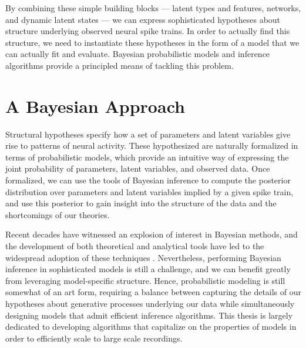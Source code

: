 By combining these simple building blocks --- latent types and features, 
networks, and dynamic latent states --- we can express sophisticated 
hypotheses about structure underlying observed neural spike trains. 
In order to actually find this structure, we need to instantiate these 
hypotheses in the form of a model that we can actually fit and evaluate.
Bayesian probabilistic models and inference algorithms provide a principled 
means of tackling this problem.


\section{A Bayesian Approach} 
Structural hypotheses specify how a set of parameters and latent
variables give rise to patterns of neural activity.  These
hypothesized are naturally formalized in terms of probabilistic
models, which provide an intuitive way of expressing the joint
probability of parameters, latent variables, and observed data.  Once
formalized, we can use the tools of Bayesian inference to compute the
posterior distribution over parameters and latent variables implied by
a given spike train, and use this posterior to gain insight into the
structure of the data and the shortcomings of our theories.

Recent decades have witnessed an explosion of interest in Bayesian
methods, and the development of both theoretical and analytical tools
have led to the widespread adoption of these techniques
\cite{bishop2006pattern, murphy2012probabilistic}. 
Nevertheless, performing Bayesian inference in sophisticated models 
is still a challenge, and we can benefit greatly from leveraging 
model-specific structure. 
Hence, probabilistic modeling is still somewhat of an art
form, requiring a balance between capturing the details of our
hypotheses about generative processes underlying our data while
simultaneously designing models that admit efficient inference algorithms.
This thesis is largely dedicated to developing algorithms that
capitalize on the properties of models in order to efficiently scale
to large scale recordings.


